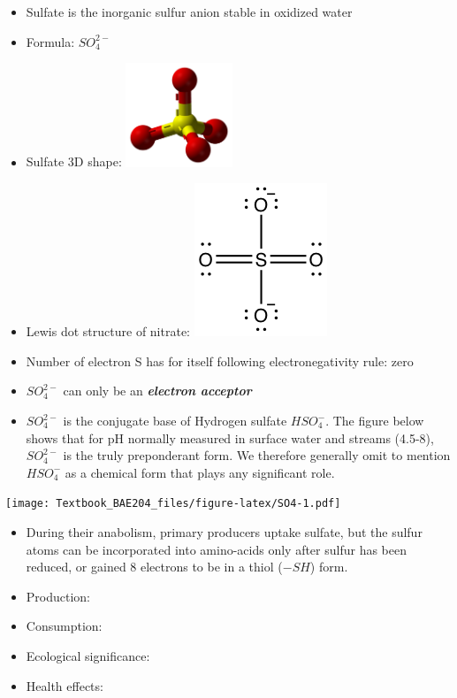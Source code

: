 \documentclass[]{book}
\providecommand{\tightlist}{%
  \setlength{\itemsep}{0pt}\setlength{\parskip}{0pt}}
\theoremstyle{definition}
\theoremstyle{definition}
\theoremstyle{definition}
\theoremstyle{remark}
\begin{document}
\begin{itemize}
\tightlist
\item
  Sulfate is the inorganic sulfur anion stable in oxidized water
\item
  Formula: \(SO_4^{2-}\)
\item
  Sulfate 3D shape:
  \includegraphics[width=0.25000\textwidth]{pictures/Sulfate-3D-balls.png}
\item
  Lewis dot structure of nitrate:
  \includegraphics{pictures/sulfate_lewis_structure.png}
\item
  Number of electron S has for itself following electronegativity rule:
  zero
\item
  \(SO_4^{2-}\) can only be an \emph{\textbf{electron acceptor}}
\item
  \(SO_4^{2-}\) is the conjugate base of Hydrogen sulfate \(HSO_4^{-}\).
  The figure below shows that for pH normally measured in surface water
  and streams (4.5-8), \(SO_4^{2-}\) is the truly preponderant form. We
  therefore generally omit to mention \(HSO_4^{-}\) as a chemical form
  that plays any significant role.
\end{itemize}

\texttt{[image: Textbook\_BAE204\_files/figure-latex/SO4-1.pdf]}

\begin{itemize}
\item
  During their anabolism, primary producers uptake sulfate, but the
  sulfur atoms can be incorporated into amino-acids only after sulfur
  has been reduced, or gained 8 electrons to be in a thiol (\(-SH\))
  form.
\item
  Production:
\item
  Consumption:
\item
  Ecological significance:
\item
  Health effects:
\end{itemize}
\end{document}
